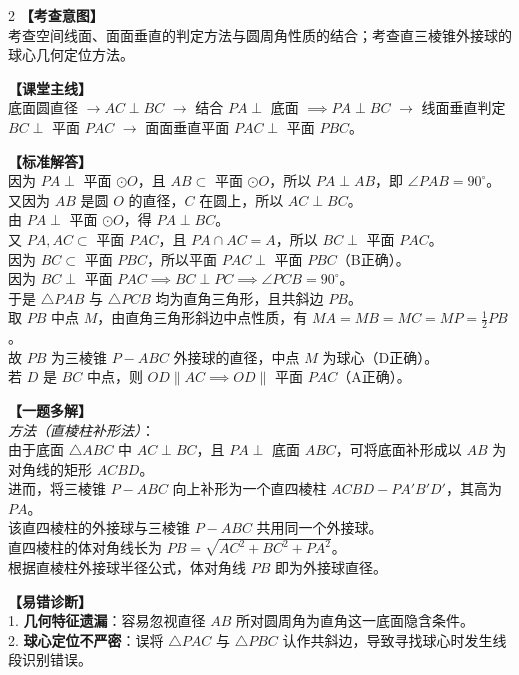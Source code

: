 \documentclass[11pt,a4paper]{ctexart}
\begin{document}
\begin{paracol}{2}
  \textbf{【考查意图】}\\
  考查空间线面、面面垂直的判定方法与圆周角性质的结合；考查直三棱锥外接球的球心几何定位方法。
  
  \textbf{【课堂主线】}\\
  底面圆直径 $\to AC \perp BC$ $\to$ 结合 $PA \perp$ 底面 $\implies PA \perp BC$ $\to$ 线面垂直判定 $BC \perp$ 平面 $PAC$ $\to$ 面面垂直平面 $PAC \perp$ 平面 $PBC$。
  
  \textbf{【标准解答】}\\
  因为 $PA\perp$ 平面 $\odot O$，且 $AB\subset$ 平面 $\odot O$，所以 $PA\perp AB$，即 $\angle PAB=90^\circ$。\\
  又因为 $AB$ 是圆 $O$ 的直径，$C$ 在圆上，所以 $AC\perp BC$。\\
  由 $PA\perp$ 平面 $\odot O$，得 $PA\perp BC$。\\
  又 $PA,AC\subset$ 平面 $PAC$，且 $PA\cap AC=A$，所以 $BC\perp$ 平面 $PAC$。\\
  因为 $BC \subset$ 平面 $PBC$，所以平面 $PAC \perp$ 平面 $PBC$（B正确）。\\
  因为 $BC\perp$ 平面 $PAC \implies BC\perp PC \implies \angle PCB=90^\circ$。\\
  于是 $\triangle PAB$ 与 $\triangle PCB$ 均为直角三角形，且共斜边 $PB$。\\
  取 $PB$ 中点 $M$，由直角三角形斜边中点性质，有 $MA = MB = MC = MP = \frac{1}{2}PB$。\\
  故 $PB$ 为三棱锥 $P-ABC$ 外接球的直径，中点 $M$ 为球心（D正确）。\\
  若 $D$ 是 $BC$ 中点，则 $OD \parallel AC \implies OD \parallel$ 平面 $PAC$（A正确）。
  
  \textbf{【一题多解】}\\
  \textit{方法（直棱柱补形法）}：\\
  由于底面 $\triangle ABC$ 中 $AC \perp BC$，且 $PA \perp$ 底面 $ABC$，可将底面补形成以 $AB$ 为对角线的矩形 $ACBD$。\\
  进而，将三棱锥 $P-ABC$ 向上补形为一个直四棱柱 $ACBD - P A' B' D'$，其高为 $PA$。\\
  该直四棱柱的外接球与三棱锥 $P-ABC$ 共用同一个外接球。\\
  直四棱柱的体对角线长为 $PB = \sqrt{AC^2 + BC^2 + PA^2}$。\\
  根据直棱柱外接球半径公式，体对角线 $PB$ 即为外接球直径。

  \switchcolumn
  \textbf{【易错诊断】}\\
  1. \textbf{几何特征遗漏}：容易忽视直径 $AB$ 所对圆周角为直角这一底面隐含条件。\\
  2. \textbf{球心定位不严密}：误将 $\triangle PAC$ 与 $\triangle PBC$ 认作共斜边，导致寻找球心时发生线段识别错误。
  

\end{paracol}
\end{document}
